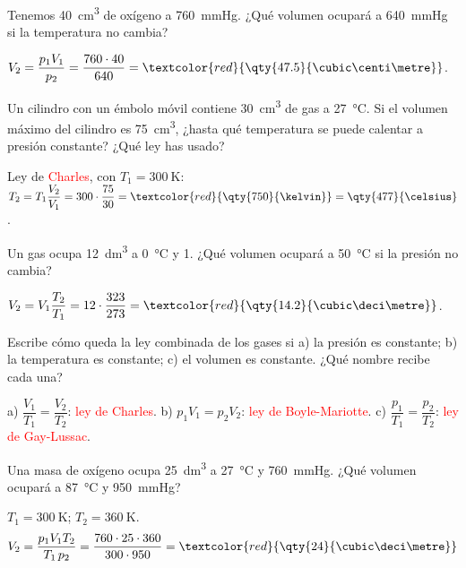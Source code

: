 \begin{exercise}
    Tenemos \qty{40}{\cubic\centi\metre} de oxígeno a \qty{760}{\mmHg}. ¿Qué volumen ocupará a \qty{640}{\mmHg} si la temperatura no cambia?
    \begin{solu}
        \(V_2 = \dfrac{p_1 V_1}{p_2} = \dfrac{760 \cdot 40}{640} = \textcolor{red}{\qty{47.5}{\cubic\centi\metre}}\).
    \end{solu}
\end{exercise}

\begin{exercise}
    Un cilindro con un émbolo móvil contiene \qty{30}{\cubic\centi\metre} de gas a \qty{27}{\celsius}. Si el volumen máximo del cilindro es \qty{75}{\cubic\centi\metre}, ¿hasta qué temperatura se puede calentar a presión constante? ¿Qué ley has usado?
    \begin{solu}
        Ley de \textcolor{red}{Charles}, con \(T_1 = \qty{300}{\kelvin}\):
        \(T_2 = T_1 \dfrac{V_2}{V_1} = 300 \cdot \dfrac{75}{30} = \textcolor{red}{\qty{750}{\kelvin}} = \qty{477}{\celsius}\).
    \end{solu}
\end{exercise}

\begin{exercise}
    Un gas ocupa \qty{12}{\cubic\deci\metre} a \qty{0}{\celsius} y \qty{1}{\atm}. ¿Qué volumen ocupará a \qty{50}{\celsius} si la presión no cambia?
    \begin{solu}
        \(V_2 = V_1 \dfrac{T_2}{T_1} = 12 \cdot \dfrac{323}{273} = \textcolor{red}{\qty{14.2}{\cubic\deci\metre}}\).
    \end{solu}
\end{exercise}

\begin{exercise}
    Escribe cómo queda la ley combinada de los gases si a) la presión es constante; b) la temperatura es constante; c) el volumen es constante. ¿Qué nombre recibe cada una?
    \begin{solu}
        a) \(\dfrac{V_1}{T_1} = \dfrac{V_2}{T_2}\): \textcolor{red}{ley de Charles}. b) \(p_1 V_1 = p_2 V_2\): \textcolor{red}{ley de Boyle-Mariotte}. c) \(\dfrac{p_1}{T_1} = \dfrac{p_2}{T_2}\): \textcolor{red}{ley de Gay-Lussac}.
    \end{solu}
\end{exercise}

\begin{exercise}
    Una masa de oxígeno ocupa \qty{25}{\cubic\deci\metre} a \qty{27}{\celsius} y \qty{760}{\mmHg}. ¿Qué volumen ocupará a \qty{87}{\celsius} y \qty{950}{\mmHg}?
    \begin{solu}
        \(T_1 = \qty{300}{\kelvin}\); \(T_2 = \qty{360}{\kelvin}\).
        \[ V_2 = \frac{p_1 V_1 T_2}{T_1 \, p_2} = \frac{760 \cdot 25 \cdot 360}{300 \cdot 950} = \textcolor{red}{\qty{24}{\cubic\deci\metre}} \]
    \end{solu}
\end{exercise}

